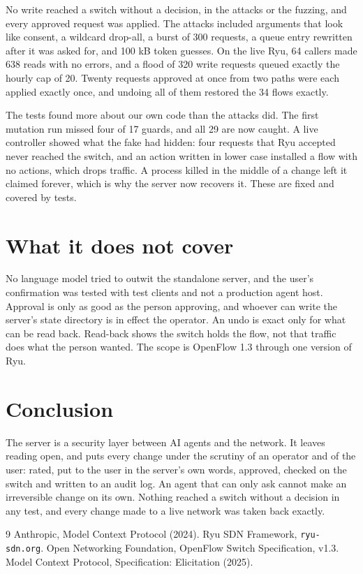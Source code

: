 \documentclass[10pt,letterpaper]{article}
\begin{document}
No write reached a switch without a decision, in the attacks or the fuzzing, and every approved request was applied. The attacks included arguments that look like consent, a wildcard drop-all, a burst of 300 requests, a queue entry rewritten after it was asked for, and 100 kB token guesses. On the live Ryu, 64 callers made 638 reads with no errors, and a flood of 320 write requests queued exactly the hourly cap of 20. Twenty requests approved at once from two paths were each applied exactly once, and undoing all of them restored the 34 flows exactly.

The tests found more about our own code than the attacks did. The first mutation run missed four of 17 guards, and all 29 are now caught. A live controller showed what the fake had hidden: four requests that Ryu accepted never reached the switch, and an action written in lower case installed a flow with no actions, which drops traffic. A process killed in the middle of a change left it claimed forever, which is why the server now recovers it. These are fixed and covered by tests.

\section*{What it does not cover}

No language model tried to outwit the standalone server, and the user's confirmation was tested with test clients and not a production agent host. Approval is only as good as the person approving, and whoever can write the server's state directory is in effect the operator. An undo is exact only for what can be read back. Read-back shows the switch holds the flow, not that traffic does what the person wanted. The scope is OpenFlow 1.3 through one version of Ryu.

\section*{Conclusion}

The server is a security layer between AI agents and the network. It leaves reading open, and puts every change under the scrutiny of an operator and of the user: rated, put to the user in the server's own words, approved, checked on the switch and written to an audit log. An agent that can only ask cannot make an irreversible change on its own. Nothing reached a switch without a decision in any test, and every change made to a live network was taken back exactly.

\begin{thebibliography}{9}\footnotesize\setlength{\itemsep}{0pt}
 Anthropic, Model Context Protocol (2024).
 Ryu SDN Framework, \texttt{ryu-sdn.org}.
 Open Networking Foundation, OpenFlow Switch Specification, v1.3.
 Model Context Protocol, Specification: Elicitation (2025).
\end{thebibliography}
\end{document}
